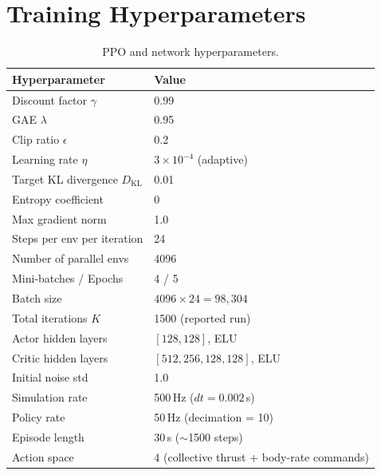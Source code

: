\documentclass[conference]{IEEEtran}
\begin{document}
\section{Training Hyperparameters}

\begin{table}[h]
\centering
\caption{PPO and network hyperparameters.}
\label{tab:ppo}
\begin{tabular}{@{}ll@{}}
\toprule
\textbf{Hyperparameter} & \textbf{Value} \\
\midrule
Discount factor $\gamma$ & 0.99 \\
GAE $\lambda$ & 0.95 \\
Clip ratio $\epsilon$ & 0.2 \\
Learning rate $\eta$ & $3\!\times\!10^{-4}$ (adaptive) \\
Target KL divergence $D_{\text{KL}}$ & 0.01 \\
Entropy coefficient & 0 \\
Max gradient norm & 1.0 \\
Steps per env per iteration & 24 \\
Number of parallel envs & 4096 \\
Mini-batches / Epochs & 4 / 5 \\
Batch size & $4096 \times 24 = 98{,}304$ \\
Total iterations $K$ & 1500 (reported run) \\
\midrule
Actor hidden layers & $[128, 128]$, ELU \\
Critic hidden layers & $[512, 256, 128, 128]$, ELU \\
Initial noise std & 1.0 \\
\midrule
Simulation rate & 500\,Hz ($dt=0.002$\,s) \\
Policy rate & 50\,Hz (decimation = 10) \\
Episode length & 30\,s ($\sim$1500 steps) \\
Action space & 4 (collective thrust + body-rate commands) \\
\bottomrule
\end{tabular}
\end{table}
\end{document}
